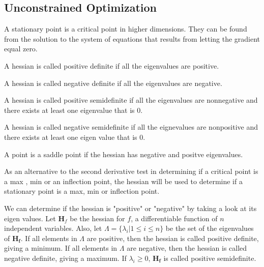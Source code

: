 \documentclass[11pt,twoside=semi,openright,numbers=noenddot]{scrbook}
\begin{document}
\subsection{Unconstrained Optimization}
\begin{definition}
    A \alert{stationary point} is a critical point in higher dimensions. They
    can be found from the solution to the system of equations that results
    from letting the gradient equal zero.
\end{definition}
\begin{definition}
    A hessian is called \alert{positive definite} if all the eigenvalues
    are positive.
\end{definition}
\begin{definition}
    A hessian is called \alert{negative definite} if all the eigenvalues
    are negative.
\end{definition}
\begin{definition}
    A hessian is called \alert{positive semidefinite} if all the eigenvalues
    are nonnegative and there exists at least one eigenvalue that is $0$.
\end{definition}
\begin{definition}
    A hessian is called \alert{negative semidefinite} if all the eignevalues
    are nonpositive and there exists at least one eigen value that is $0$.
\end{definition}
\begin{definition}
    A point is a \alert{saddle point} if the hessian has negative and positve
    eigenvalues.
\end{definition}
As an alternative to the second derivative test in determining if a critical
point is a max , min or an inflection point, the \alert{hessian} will be used 
to determine if a stationary point is a max, min or inflection point.
\begin{theorem}

\end{theorem}
We can determine if the hessian is "positive" or "negative" by taking a look
at its eigen values. Let $\mathbf{H}_f$ be the hessian for $f$, a differentiable
function of $n$ independent variables. Also, let $\Lambda = \{\lambda_i | 1 \leq i \leq n\}$
be the set of the eigenvalues of $\mathbf{H_f}$. If all elements in $\Lambda$ are positive,
then the hessian is called \alert{positive definite}, giving a minimum. If all 
elements in $\Lambda$ are negative, then the hessian is called \alert{negative definite},
giving a maximum. If $\lambda_i \geq 0$, $\mathbf{H_f}$ is called \alert{positive semidefinite}.
\end{document}
